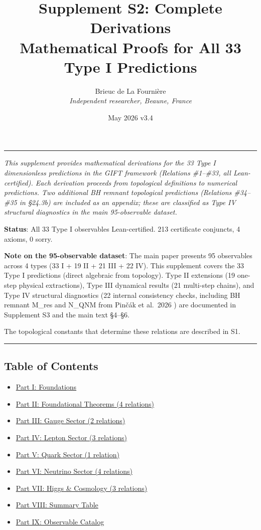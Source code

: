 \documentclass[11pt,a4paper]{article}
\title{%
\LARGE\textbf{Supplement S2: Complete Derivations}\\[0.3em]
\large Mathematical Proofs for All 33 Type I Predictions%
}
\author{Brieuc de La Fourni\`ere \\ \textit{Independent researcher, Beaune, France}}
\date{May 2026 \quad\textbar\quad v3.4}
\begin{document}
\maketitle
\noindent\rule{\textwidth}{0.2pt}
\thispagestyle{fancy}

\tableofcontents
\newpage



\emph{This supplement provides mathematical derivations for the 33 Type I dimensionless predictions in the GIFT framework (Relations \#1--\#33, all Lean-certified). Each derivation proceeds from topological definitions to numerical predictions. Two additional BH remnant topological predictions (Relations \#34--\#35 in §24.3b) are included as an appendix; these are classified as Type IV structural diagnostics in the main 95-observable dataset.}

\textbf{Status}: All 33 Type I observables Lean-certified. 213 certificate conjuncts, 4 axioms, 0 sorry.

\textbf{Note on the 95-observable dataset}: The main paper presents 95 observables across 4 types (33 I + 19 II + 21 III + 22 IV). This supplement covers the 33 Type I predictions (direct algebraic from topology). Type II extensions (19 one-step physical extractions), Type III dynamical results (21 multi-step chains), and Type IV structural diagnostics (22 internal consistency checks, including BH remnant M\_res and N\_QNM from Pinčák et al.~2026 \cite{42}) are documented in Supplement S3 and the main text §4--§6.

The topological constants that determine these relations are described in S1.

\begin{center}\rule{0.5\linewidth}{0.5pt}\end{center}

\subsection{Table of Contents}\label{table-of-contents}

\begin{itemize}
\item
  \hyperref[part-i-foundations]{Part I: Foundations}
\item
  \hyperref[part-ii-foundational-theorems]{Part II: Foundational Theorems (4 relations)}
\item
  \hyperref[part-iii-gauge-sector]{Part III: Gauge Sector (2 relations)}
\item
  \hyperref[part-iv-lepton-sector]{Part IV: Lepton Sector (3 relations)}
\item
  \hyperref[part-v-quark-sector]{Part V: Quark Sector (1 relation)}
\item
  \hyperref[part-vi-neutrino-sector]{Part VI: Neutrino Sector (4 relations)}
\item
  \hyperref[part-vii-higgs-cosmology]{Part VII: Higgs \& Cosmology (3 relations)}
\item
  \hyperref[part-viii-summary-table]{Part VIII: Summary Table}
\item
  \hyperref[part-ix-observable-catalog]{Part IX: Observable Catalog}
\end{itemize}
\end{document}
